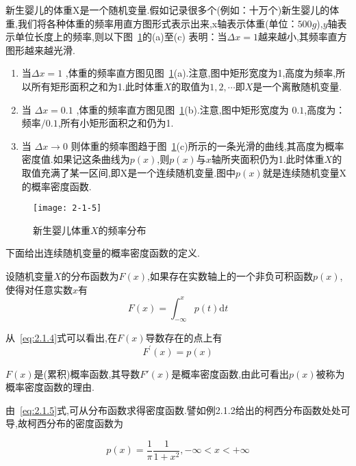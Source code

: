 \begin{example}
	新生婴儿的体重X是一个随机变量.假如记录很多个(例如：十万个)新生婴儿的体重,我们将各种体重的频率用直方图形式表示出来,x轴表示体重(单位：$ 500g $),$ y $轴表示单位长度上的频率,则以下图~\ref{fig:2-1-5}的(a)至(c)
	表明：当$\Delta x=1$越来越小,其频率直方图形越来越光滑.
	
	\begin{enumerate}
		\item 当$\Delta x=1$ ,体重的频率直方图见图~\ref{fig:2-1-5}(a).注意,图中矩形宽度为1,高度为频率,所以所有矩形面积之和为1.此时体重$ X $的取值为$1,2, \cdots $即$ X $是一个离散随机变量.
		\item 当 $\Delta x=0.1$ ,体重的频率直方图见图~\ref{fig:2-1-5}(b).注意,图中矩形宽度为
		$ 0.1 $,高度为：频率$ /0.1 $,所有小矩形面积之和仍为1.
		\item 当 $\Delta x \rightarrow 0$ 则体重的频率图趋于图~\ref{fig:2-1-5}(c)所示的一条光滑的曲线,其高度为概率密度值.如果记这条曲线为$ p(x) $,则$ p(x) $与$ x $轴所夹面积仍为1.此时体重$ X $的取值充满了某一区间,即X是一个连续随机变量.图中$ p(x) $就是连续随机变量X的概率密度函数.
	\end{enumerate}
	
\end{example}

\begin{figure}
	\centering
	\texttt{[image: 2-1-5]}
	\caption{新生婴儿体重$ X $的频率分布}
	\label{fig:2-1-5}
\end{figure}

下面给出连续随机变量的概率密度函数的定义.

\begin{definition}
	设随机变量$ X $的分布函数为$ F(x) $,如果存在实数轴上的一个非负可积函数$ p(x) $,使得对任意实数$ x $有
	\begin{equation} 
	F(x)=\int_{-\infty}^{x} p(t) \mathrm{d} t \label{eq:2.1.4}
	\end{equation}
	
	从~\ref{eq:2.1.4}式可以看出,在$ F(x) $导数存在的点上有
	\begin{equation} 
	F^{\prime}(x)=p(x) \label{eq:2.1.5}
	\end{equation}
	
	$ F(x) $是(累积)概率函数,其导数$ F'(x) $是概率密度函数,由此可看出$ p(x) $被称为概率密度函数的理由.
	
	由~\ref{eq:2.1.5}式,可从分布函数求得密度函数.譬如例2.1.2给出的柯西分布函数处处可导,故柯西分布的密度函数为
	
	\[ 
	p(x)=\frac{1}{\pi} \frac{1}{1+x^{2}},-\infty<x<+\infty
	\]
\end{definition}

